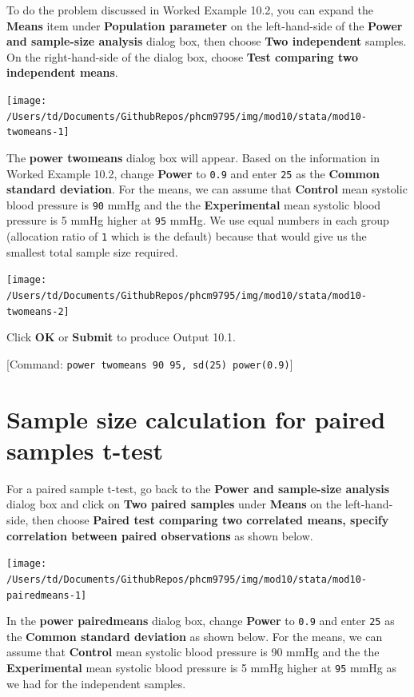 \documentclass[
]{memoir}
\begin{document}
To do the problem discussed in Worked Example 10.2, you can expand the \textbf{Means} item under \textbf{Population parameter} on the left-hand-side of the \textbf{Power and sample-size analysis} dialog box, then choose \textbf{Two independent} samples. On the right-hand-side of the dialog box, choose \textbf{Test comparing two independent means}.

\texttt{[image: /Users/td/Documents/GithubRepos/phcm9795/img/mod10/stata/mod10-twomeans-1]}

The \textbf{power twomeans} dialog box will appear. Based on the information in Worked Example 10.2, change \textbf{Power} to \texttt{0.9} and enter \texttt{25} as the \textbf{Common standard deviation}. For the means, we can assume that \textbf{Control} mean systolic blood pressure is \texttt{90} mmHg and the the \textbf{Experimental} mean systolic blood pressure is 5 mmHg higher at \texttt{95} mmHg. We use equal numbers in each group (allocation ratio of \texttt{1} which is the default) because that would give us the smallest total sample size required.

\texttt{[image: /Users/td/Documents/GithubRepos/phcm9795/img/mod10/stata/mod10-twomeans-2]}

Click \textbf{OK} or \textbf{Submit} to produce Output 10.1.

{[}Command: \texttt{power\ twomeans\ 90\ 95,\ sd(25)\ power(0.9)}{]}

\hypertarget{sample-size-calculation-for-paired-samples-t-test}{%
\section{Sample size calculation for paired samples t-test}\label{sample-size-calculation-for-paired-samples-t-test}}

For a paired sample t-test, go back to the \textbf{Power and sample-size analysis} dialog box and click on \textbf{Two paired samples} under \textbf{Means} on the left-hand-side, then choose \textbf{Paired test comparing two correlated means, specify correlation between paired observations} as shown below.

\texttt{[image: /Users/td/Documents/GithubRepos/phcm9795/img/mod10/stata/mod10-pairedmeans-1]}

In the \textbf{power pairedmeans} dialog box, change \textbf{Power} to \texttt{0.9} and enter \texttt{25} as the \textbf{Common standard deviation} as shown below. For the means, we can assume that \textbf{Control} mean systolic blood pressure is 90 mmHg and the the \textbf{Experimental} mean systolic blood pressure is 5 mmHg higher at \texttt{95} mmHg as we had for the independent samples.
\end{document}
